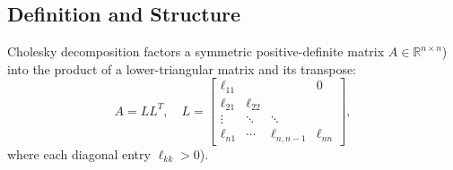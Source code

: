 \subsection{Definition and Structure}
Cholesky decomposition factors a symmetric positive-definite matrix \(A \in \mathbb{R}^{n \times n}\)) into the product of a lower-triangular matrix and its transpose:
\[
    A = LL^T,
    \quad
    L = \begin{bmatrix}
        \ell_{11} &           &              & 0         \\
        \ell_{21} & \ell_{22} &              &           \\
        \vdots    & \ddots    & \ddots       &           \\
        \ell_{n1} & \cdots    & \ell_{n,n-1} & \ell_{nn}
    \end{bmatrix},
\]
where each diagonal entry \(\ell_{kk}>0\)).
